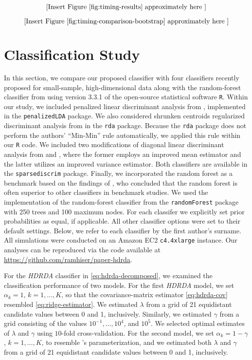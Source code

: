 \documentclass[]{interact}\usepackage[]{graphicx}\usepackage[]{color}
\begin{document}
\[ \left[\text{Insert Figure \ref{fig:timing-results} approximately here }\right] \]

\[ \left[\text{Insert Figure \ref{fig:timing-comparison-bootstrap} approximately here }\right] \]

\section{Classification Study}
\label{sec:sims}

In this section, we compare our proposed classifier with four classifiers
recently proposed for small-sample, high-dimensional data along with the
random-forest classifier from \cite{Breiman:2001fb} using version 3.3.1 of the
open-source statistical software {\tt R}. Within our study, we included
penalized linear discriminant analysis from \cite{Witten:2011kc}, implemented in
the {\tt penalizedLDA} package. We also considered shrunken centroids
regularized discriminant analysis from \cite{Guo:2007te} in the {\tt rda}
package. Because the {\tt rda} package does not perform the authors' ``Min-Min''
rule automatically, we applied this rule within our {\tt R} code. We included
two modifications of diagonal linear discriminant analysis from
\cite{Tong:2012hw} and \cite{Pang:2009ik}, where the former employs an improved
mean estimator and the latter utilizes an improved variance estimator. Both
classifiers are available in the {\tt sparsediscrim} package. Finally, we
incorporated the random forest as a benchmark based on the findings of
\cite{FernandezDelgado:2014ul}, who concluded that the random forest is often
superior to other classifiers in benchmark studies. We used the implementation
of the random-forest classifier from the {\tt randomForest} package with 250
trees and 100 maximum nodes. For each classifer we explicitly set prior
probabilities as equal, if applicable. All other classifier options were set to
their default settings. Below, we refer to each classifier by the first author's
surname. All simulations were conducted on an Amazon EC2 {\tt c4.4xlarge}
instance. Our analyses can be reproduced via the code available at
\url{https://github.com/ramhiser/paper-hdrda}.

For the \emph{HDRDA} classifier in \eqref{eq:hdrda-decomposed}, we examined the
classification performance of two models. For the first \emph{HDRDA} model, we
set $\alpha_k = 1$, $k = 1, \ldots, K$, so that the covariance-matrix estimator
\eqref{eq:hdrda-cov} resembled \eqref{eq:ridge-estimator}. We estimated
$\lambda$ from a grid of 21 equidistant candidate values between 0 and 1,
inclusively. Similarly, we estimated $\gamma$ from a grid consisting of the
values $10^{-1}, \ldots, 10^4$, and $10^5$. We selected optimal estimates of
$\lambda$ and $\gamma$ using $10$-fold cross-validation. For the second model,
we set $\alpha_k = 1 - \gamma$, $k = 1, \ldots, K$, to resemble
\citeauthor{Friedman:1989tm}'s parameterization, and we estimated both $\lambda$
and $\gamma$ from a grid of 21 equidistant candidate values between 0 and 1,
inclusively.
\end{document}
